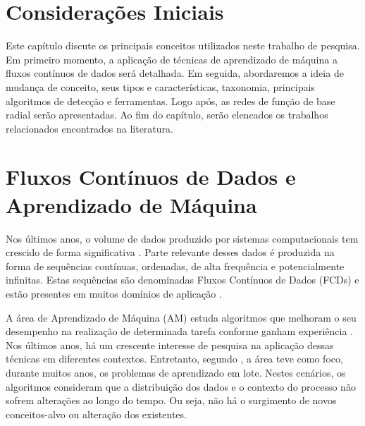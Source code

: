 \documentclass[qual, classic, a4paper]{ufbathesis}
\begin{document}
 \label{revisao_bibliografica}
\section{Considerações Iniciais}

Este capítulo discute os principais conceitos utilizados neste trabalho de pesquisa.
Em primeiro momento, a aplicação de técnicas de aprendizado de máquina a fluxos contínuos de dados será detalhada.
Em seguida, abordaremos a ideia de mudança de conceito, seus tipos e características, taxonomia, principais algoritmos de detecção e ferramentas.
Logo após, as redes de função de base radial serão apresentadas.
Ao fim do capítulo, serão elencados os trabalhos relacionados encontrados na literatura.

\section{Fluxos Contínuos de Dados e Aprendizado de Máquina}

Nos últimos anos, o volume de dados produzido por sistemas computacionais tem crescido de forma significativa \cite{Cohen:BigData:2009:MSN:1687553.1687576}.
Parte relevante desses dados é produzida na forma de sequências contínuas, ordenadas, de alta frequência e potencialmente infinitas.
Estas sequências são denominadas Fluxos Contínuos de Dados (FCDs) e estão presentes em muitos domínios de aplicação \cite{Aggarwal:2006:DSM:1196418}.



A área de Aprendizado de Máquina (AM) estuda algoritmos que melhoram o seu desempenho na realização de determinada tarefa conforme ganham experiência \cite{Mitchell:1997:ML:541177}.
Nos últimos anos, há um crescente interesse de pesquisa na aplicação dessas técnicas em diferentes contextos.
Entretanto, segundo \cite{Gama:2010:KDD:1855075}, a área teve como foco, durante muitos anos, os problemas de aprendizado em lote.
Nestes cenários, os algoritmos consideram que a distribuição dos dados e o contexto do processo não sofrem alterações ao longo do tempo.
Ou seja, não há o surgimento de novos conceitos-alvo ou alteração dos existentes.
\end{document}
